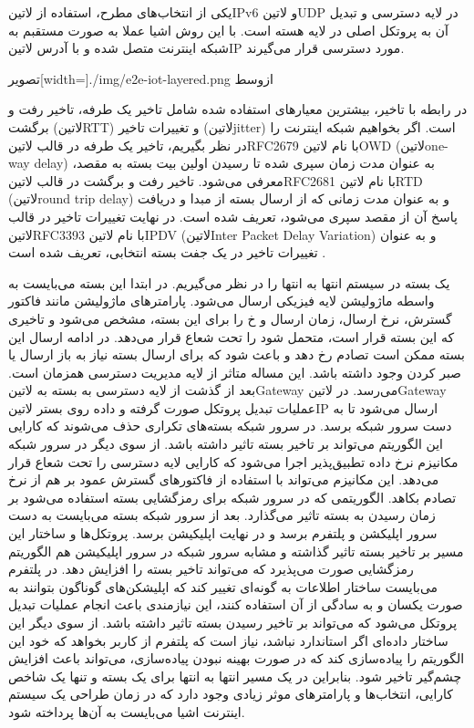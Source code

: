 یکی از انتخاب‌های مطرح، استفاده از ‌لاتین{IPv6} و ‌لاتین{UDP} در لایه دسترسی و تبدیل آن به پروتکل اصلی در لایه هسته است. با این روش
اشیا عملا به صورت مستقبم به شبکه اینترنت متصل شده و با آدرس ‌لاتین{IP} مورد دسترسی قرار می‌گیرند.

‌تصویر[width=\textwidth]{./img/e2e-iot-layered.png}
‌ازوسط

در رابطه با تاخیر، بیشترین معیارهای استفاده شده شامل تاخیر یک طرفه، تاخیر رفت و برگشت (‌لاتین{RTT}) و تغییرات تاخیر (‌لاتین{jitter}) است.
اگر بخواهیم شبکه اینترنت را در نظر بگیریم، تاخیر یک طرفه در قالب ‌لاتین{RFC2679} با نام ‌لاتین{OWD} (‌لاتین{one-way delay}) به عنوان مدت زمان
سپری شده تا رسیدن اولین بیت بسته به مقصد،
معرفی می‌شود. تاخیر رفت و برگشت در قالب ‌لاتین{RFC2681} با نام ‌لاتین{RTD} (‌لاتین{round trip delay}) و به عنوان مدت زمانی
که از ارسال بسته از مبدا و دریافت پاسخ آن از مقصد سپری می‌شود، تعریف شده است.
در نهایت تغییرات تاخیر در قالب ‌لاتین{RFC3393} با نام ‌لاتین{IPDV} (‌لاتین{Inter Packet Delay Variation}) و به عنوان
تغییرات تاخیر در یک جفت بسته انتخابی، تعریف شده است
.


یک بسته در سیستم انتها به انتها را در نظر می‌گیریم. در ابتدا این بسته می‌بایست به واسطه ماژولیشن لایه فیزیکی ارسال می‌شود.
پارامترهای ماژولیشن مانند فاکتور گسترش، نرخ ارسال، زمان ارسال و ‌خ را برای این بسته، مشخص می‌شود و تاخیری که این بسته قرار است،
متحمل شود را تحت شعاع قرار می‌دهد. در ادامه ارسال این بسته ممکن است تصادم رخ دهد و باعث شود که برای ارسال بسته نیاز به باز ارسال
یا صبر کردن وجود داشته باشد. این مساله متاثر از لایه مدیریت دسترسی همزمان است. بعد از گذشت از لایه دسترسی به بسته به ‌لاتین{Gateway}
می‌رسد.
در ‌لاتین{Gateway} عملیات تبدیل پروتکل صورت گرفته و داده روی بستر ‌لاتین{IP} ارسال می‌شود تا به دست سرور شبکه برسد.
در سرور شبکه بسته‌های تکراری حذف می‌شوند که کارایی این الگوریتم می‌تواند بر تاخیر بسته تاثیر داشته باشد. از سوی دیگر در سرور شبکه
مکانیزم نرخ داده تطبیق‌پذیر اجرا می‌شود که کارایی لایه دسترسی را تحت شعاع قرار می‌دهد. این مکانیزم می‌تواند با استفاده از فاکتورهای گسترش عمود بر هم
از نرخ تصادم بکاهد. الگوریتمی که در سرور شبکه برای رمزگشایی بسته استفاده می‌شود بر زمان رسیدن به بسته تاثیر می‌گذارد.
بعد از سرور شبکه بسته می‌بایست به دست سرور اپلیکشن و پلتفرم برسد و در نهایت اپلیکیشن برسد. پروتکل‌ها و ساختار این مسیر بر تاخیر بسته تاثیر گذاشته
و مشابه سرور شبکه در سرور اپلیکیشن هم الگوریتم رمزگشایی صورت می‌پذیرد که می‌تواند تاخیر بسته را افزایش دهد.
در پلتفرم می‌بایست ساختار اطلاعات به گونه‌ای تغییر کند که اپلیشکن‌های گوناگون بتوانند به صورت یکسان و به سادگی از آن استفاده کنند،
این نیازمندی باعث انجام عملیات تبدیل پروتکل می‌شود که می‌تواند بر تاخیر رسیدن بسته تاثیر داشته باشد. از سوی دیگر این ساختار داده‌ای
اگر استاندارد نباشد، نیاز است که پلتفرم از کاربر بخواهد که خود این الگوریتم را پیاده‌سازی کند که در صورت بهینه نبودن پیاده‌سازی، می‌تواند باعث
افزایش چشم‌گیر تاخیر شود.
بنابراین در یک مسیر انتها به انتها برای یک بسته و تنها یک شاخص کارایی، انتخاب‌ها و پارامترهای موثر زیادی وجود دارد
که در زمان طراحی یک سیستم اینترنت اشیا می‌بایست به آن‌ها پرداخته شود.

